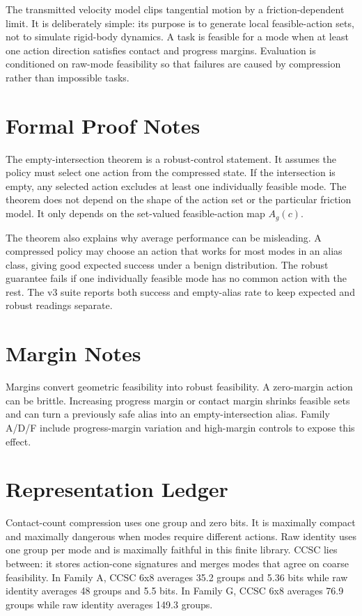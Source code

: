 \documentclass{article}
\begin{document}
The transmitted velocity model clips tangential motion by a friction-dependent limit. It is deliberately simple: its purpose is to generate local feasible-action sets, not to simulate rigid-body dynamics. A task is feasible for a mode when at least one action direction satisfies contact and progress margins. Evaluation is conditioned on raw-mode feasibility so that failures are caused by compression rather than impossible tasks.

\section{Formal Proof Notes}
The empty-intersection theorem is a robust-control statement. It assumes the policy must select one action from the compressed state. If the intersection is empty, any selected action excludes at least one individually feasible mode. The theorem does not depend on the shape of the action set or the particular friction model. It only depends on the set-valued feasible-action map $A_g(c)$.

The theorem also explains why average performance can be misleading. A compressed policy may choose an action that works for most modes in an alias class, giving good expected success under a benign distribution. The robust guarantee fails if one individually feasible mode has no common action with the rest. The v3 suite reports both success and empty-alias rate to keep expected and robust readings separate.

\section{Margin Notes}
Margins convert geometric feasibility into robust feasibility. A zero-margin action can be brittle. Increasing progress margin or contact margin shrinks feasible sets and can turn a previously safe alias into an empty-intersection alias. Family A/D/F include progress-margin variation and high-margin controls to expose this effect.

\section{Representation Ledger}
Contact-count compression uses one group and zero bits. It is maximally compact and maximally dangerous when modes require different actions. Raw identity uses one group per mode and is maximally faithful in this finite library. CCSC lies between: it stores action-cone signatures and merges modes that agree on coarse feasibility. In Family A, CCSC 6x8 averages 35.2 groups and 5.36 bits while raw identity averages 48 groups and 5.5 bits. In Family G, CCSC 6x8 averages 76.9 groups while raw identity averages 149.3 groups.
\end{document}
